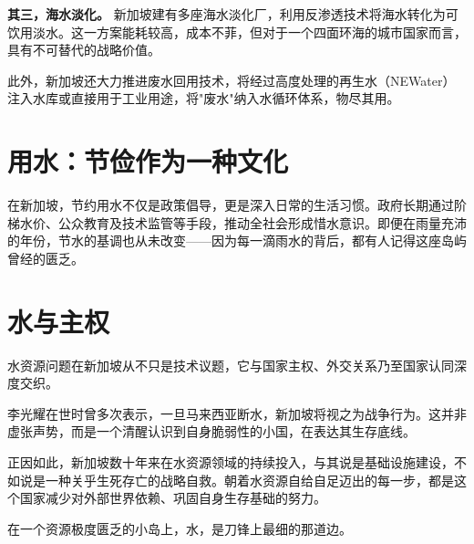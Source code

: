 \textbf{其三，海水淡化。} 新加坡建有多座海水淡化厂，利用反渗透技术将海水转化为可饮用淡水。这一方案能耗较高，成本不菲，但对于一个四面环海的城市国家而言，具有不可替代的战略价值。

此外，新加坡还大力推进废水回用技术，将经过高度处理的再生水（NEWater）注入水库或直接用于工业用途，将"废水"纳入水循环体系，物尽其用。

\section{用水：节俭作为一种文化}

在新加坡，节约用水不仅是政策倡导，更是深入日常的生活习惯。政府长期通过阶梯水价、公众教育及技术监管等手段，推动全社会形成惜水意识。即便在雨量充沛的年份，节水的基调也从未改变——因为每一滴雨水的背后，都有人记得这座岛屿曾经的匮乏。

\section{水与主权}

水资源问题在新加坡从不只是技术议题，它与国家主权、外交关系乃至国家认同深度交织。

李光耀在世时曾多次表示，一旦马来西亚断水，新加坡将视之为战争行为。这并非虚张声势，而是一个清醒认识到自身脆弱性的小国，在表达其生存底线。

正因如此，新加坡数十年来在水资源领域的持续投入，与其说是基础设施建设，不如说是一种关乎生死存亡的战略自救。朝着水资源自给自足迈出的每一步，都是这个国家减少对外部世界依赖、巩固自身生存基础的努力。

在一个资源极度匮乏的小岛上，水，是刀锋上最细的那道边。
